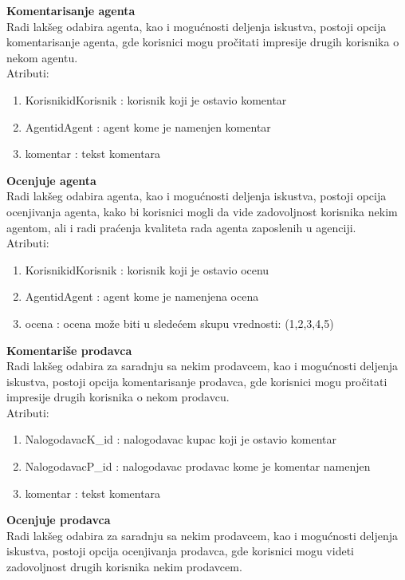 \documentclass[20pt]{article}
\begin{document}
{\bfseries Komentarisanje agenta}\\
Radi lak\v {s}eg odabira agenta, kao i mogu\' cnosti deljenja iskustva, postoji opcija komentarisanje agenta, gde korisnici mogu pro\v {c}itati impresije drugih korisnika o nekom agentu.\\
\indent Atributi:
\begin{enumerate}
        \item  KorisnikidKorisnik : korisnik koji je ostavio komentar
        \item  AgentidAgent : agent kome je namenjen komentar
        \item  komentar : tekst komentara
\end{enumerate}
\newpage
{\bfseries Ocenjuje agenta}\\
Radi lak\v {s}eg odabira agenta, kao i mogu\' cnosti deljenja iskustva, postoji opcija ocenjivanja agenta, kako bi korisnici mogli da vide zadovoljnost korisnika nekim agentom, ali i radi pra\' cenja kvaliteta rada agenta zaposlenih u agenciji.\\
\indent Atributi:
\begin{enumerate}
        \item  KorisnikidKorisnik : korisnik koji je ostavio ocenu
        \item  AgentidAgent : agent kome je namenjena ocena
        \item  ocena : ocena mo\v {z}e biti u slede\' cem skupu vrednosti: (1,2,3,4,5)
\end{enumerate}
{\bfseries Komentari\v {s}e prodavca}\\
Radi lak\v {s}eg odabira za saradnju sa nekim prodavcem, kao i mogu\' cnosti deljenja iskustva, postoji opcija komentarisanje prodavca, gde korisnici mogu pro\v {c}itati impresije drugih korisnika o nekom prodavcu.\\
\indent Atributi:
\begin{enumerate}
        \item  NalogodavacK\_id : nalogodavac kupac koji je ostavio komentar
        \item  NalogodavacP\_id : nalogodavac prodavac kome je komentar namenjen
        \item  komentar : tekst komentara
\end{enumerate}
{\bfseries Ocenjuje prodavca}\\
Radi lak\v {s}eg odabira za saradnju sa nekim prodavcem, kao i mogu\' cnosti deljenja iskustva, postoji opcija ocenjivanja prodavca, gde korisnici mogu videti zadovoljnost drugih korisnika nekim prodavcem.\\
\end{document}
